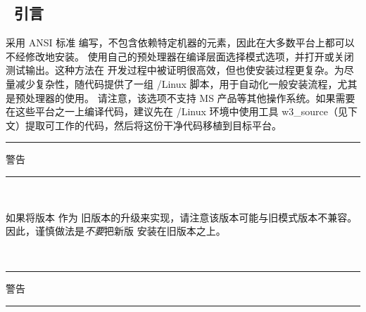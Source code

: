 \vssub
\subsection{~引言}
\vssub

\ws{} 采用 ANSI 标准  编写，不包含依赖特定机器的元素，因此在大多数平台上都可以不经修改地安装。\ws{} 使用自己的预处理器在编译层面选择模式选项，并打开或关闭测试输出。这种方法在 \ws{} 开发过程中被证明很高效，但也使安装过程更复杂。为尽量减少复杂性，随代码提供了一组 \unix/Linux 脚本，用于自动化一般安装流程，尤其是预处理器的使用。
请注意，该选项不支持 MS 产品等其他操作系统。如果需要在这些平台之一上编译代码，建议先在 \unix/Linux 环境中使用工具 {\code w3\_source}（见下文）提取可工作的代码，然后将这份干净代码移植到目标平台。

\begin{center}
\rule[1mm]{55mm}{1.0mm} 警告 \rule[1mm]{55mm}{1.0mm} \\
\vspace{\baselineskip}
\parbox{120mm}{如果将版本 \WWver{} 作为 \ws{} 旧版本的升级来实现，请注意该版本可能与旧模式版本不兼容。因此，谨慎做法是{\it 不要}把新版 \ws{} 安装在旧版本之上。} \\ \vspace{\baselineskip}
\rule[1mm]{55mm}{1.0mm} 警告 \rule[1mm]{55mm}{1.0mm}
\end{center}
